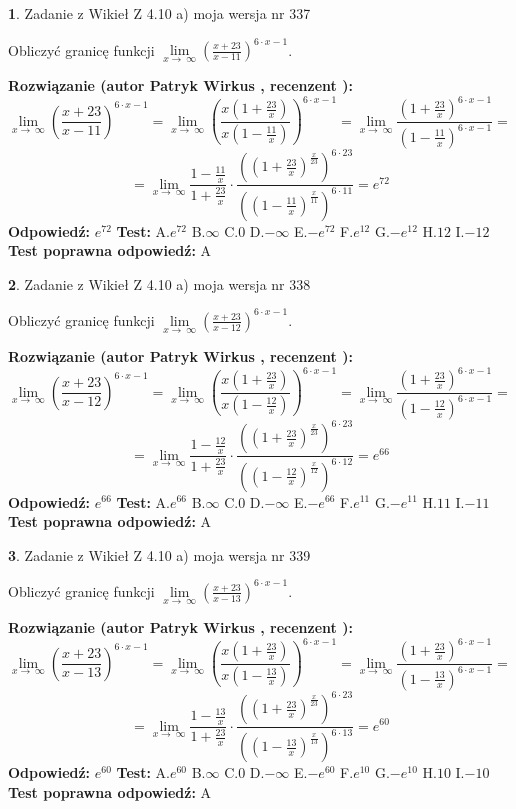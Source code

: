 \documentclass[12pt, a4paper]{article}
\theoremstyle{definition} %
\newtheorem{zad}{}
\newcommand{\zadStart}[1]{\begin{zad}#1\newline}
\newcommand{\zadStop}{\end{zad}}
\newcommand{\rozwStart}[2]{\noindent \textbf{Rozwiązanie (autor #1 , recenzent #2): }\newline}
\newcommand{\rozwStop}{\newline}
\newcommand{\odpStart}{\noindent \textbf{Odpowiedź:}\newline}
\newcommand{\odpStop}{\newline}
\newcommand{\testStart}{\noindent \textbf{Test:}\newline}
\newcommand{\testStop}{\newline}
\newcommand{\kluczStart}{\noindent \textbf{Test poprawna odpowiedź:}\newline}
\newcommand{\kluczStop}{\newline}
\begin{document}
\zadStart{Zadanie z Wikieł Z 4.10 a) moja wersja nr 337}

Obliczyć granicę funkcji  $\lim\limits_{x\to\ \infty}(\frac{x+23}{x-11})^{6\cdot x-1}$.
\zadStop
\rozwStart{Patryk Wirkus}{}
$$\lim\limits_{x\to\ \infty}(\frac{x+23}{x-11})^{6\cdot x-1} = \lim\limits_{x\to\ \infty}(\frac{x(1+\frac{23}{x})}{x(1-\frac{11}{x})})^{6\cdot x-1}=\lim\limits_{x\to\ \infty}\frac{(1+\frac{23}{x})^{6\cdot x-1}}{(1-\frac{11}{x})^{6\cdot x-1}}=$$
$$=\lim\limits_{x\to\ \infty}\frac{1-\frac{11}{x}}{1+\frac{23}{x}}\cdot\frac{((1+\frac{23}{x})^{\frac{x}{23}})^{6\cdot23}}{((1-\frac{11}{x})^{\frac{x}{11}})^{6\cdot11}}=e^{72}$$
\rozwStop
\odpStart
$e^{72}$
\odpStop
\testStart
A.$e^{72}$ B.$\infty$ C.$0$ D.$-\infty$ E.$-e^{72}$
F.$e^{12}$ G.$-e^{12}$
H.$12$
I.$-12$
\testStop
\kluczStart
A
\kluczStop



\zadStart{Zadanie z Wikieł Z 4.10 a) moja wersja nr 338}

Obliczyć granicę funkcji  $\lim\limits_{x\to\ \infty}(\frac{x+23}{x-12})^{6\cdot x-1}$.
\zadStop
\rozwStart{Patryk Wirkus}{}
$$\lim\limits_{x\to\ \infty}(\frac{x+23}{x-12})^{6\cdot x-1} = \lim\limits_{x\to\ \infty}(\frac{x(1+\frac{23}{x})}{x(1-\frac{12}{x})})^{6\cdot x-1}=\lim\limits_{x\to\ \infty}\frac{(1+\frac{23}{x})^{6\cdot x-1}}{(1-\frac{12}{x})^{6\cdot x-1}}=$$
$$=\lim\limits_{x\to\ \infty}\frac{1-\frac{12}{x}}{1+\frac{23}{x}}\cdot\frac{((1+\frac{23}{x})^{\frac{x}{23}})^{6\cdot23}}{((1-\frac{12}{x})^{\frac{x}{12}})^{6\cdot12}}=e^{66}$$
\rozwStop
\odpStart
$e^{66}$
\odpStop
\testStart
A.$e^{66}$ B.$\infty$ C.$0$ D.$-\infty$ E.$-e^{66}$
F.$e^{11}$ G.$-e^{11}$
H.$11$
I.$-11$
\testStop
\kluczStart
A
\kluczStop



\zadStart{Zadanie z Wikieł Z 4.10 a) moja wersja nr 339}

Obliczyć granicę funkcji  $\lim\limits_{x\to\ \infty}(\frac{x+23}{x-13})^{6\cdot x-1}$.
\zadStop
\rozwStart{Patryk Wirkus}{}
$$\lim\limits_{x\to\ \infty}(\frac{x+23}{x-13})^{6\cdot x-1} = \lim\limits_{x\to\ \infty}(\frac{x(1+\frac{23}{x})}{x(1-\frac{13}{x})})^{6\cdot x-1}=\lim\limits_{x\to\ \infty}\frac{(1+\frac{23}{x})^{6\cdot x-1}}{(1-\frac{13}{x})^{6\cdot x-1}}=$$
$$=\lim\limits_{x\to\ \infty}\frac{1-\frac{13}{x}}{1+\frac{23}{x}}\cdot\frac{((1+\frac{23}{x})^{\frac{x}{23}})^{6\cdot23}}{((1-\frac{13}{x})^{\frac{x}{13}})^{6\cdot13}}=e^{60}$$
\rozwStop
\odpStart
$e^{60}$
\odpStop
\testStart
A.$e^{60}$ B.$\infty$ C.$0$ D.$-\infty$ E.$-e^{60}$
F.$e^{10}$ G.$-e^{10}$
H.$10$
I.$-10$
\testStop
\kluczStart
A
\kluczStop
\end{document}
